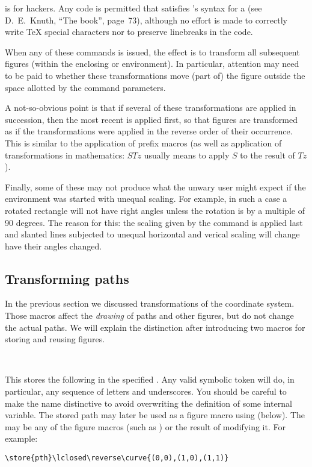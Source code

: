 \documentclass[letterpaper]{article}
\begin{document}
 is for \MF{} hackers. Any code is permitted that satisfies
\MF{}'s syntax for a  (see D.~E.~Knuth, ``The
\MF{}book'', page~73), although no effort is made to correctly write
\TeX{} special characters nor to preserve linebreaks in the code.

When any of these commands is issued, the effect is to transform all
subsequent figures (within the enclosing  or 
environment). In particular, attention may need to be paid to whether
these transformations move (part of) the figure outside the space
allotted by the  command parameters.

A not-so-obvious point is that if several of these transformations are
applied in succession, then the most recent is applied first, so that
figures are transformed as if the transformations were applied in the
reverse order of their occurrence. This is similar to the application of
prefix macros (as well as application of transformations in mathematics:
$S T z$ usually means to apply $S$ to the result of $T z$).

Finally, some of these may not produce what the unwary user might expect
if the  environment was started with unequal scaling. For
example, in such a case a rotated rectangle will not have right angles
unless the rotation is by a multiple of 90 degrees. The reason for this:
the scaling given by the  command is applied last and
slanted lines subjected to unequal horizontal and verical scaling will
change have their angles changed.


\subsection{Transforming paths}\label{transformation}

In the previous section we discussed transformations of the \MF{}
coordinate system. Those macros affect the \emph{drawing} of paths and
other figures, but do not change the actual paths. We will explain the
distinction after introducing two macros for storing and reusing
figures.

\begin{cd}
\\
%
\end{cd}

This stores the following  in the specified \MF{} . Any valid \MF{} symbolic token will do, in particular, any
sequence of letters and underscores. You should be careful to make the
name distinctive to avoid overwriting the definition of some internal
variable. The stored path may later be used as a figure macro
using  (below). The  may be any of the figure
macros (such as ) or the result of
modifying it. For example:
\begin{verbatim}
\store{pth}\lclosed\reverse\curve{(0,0),(1,0),(1,1)}
\end{verbatim}
\end{document}
